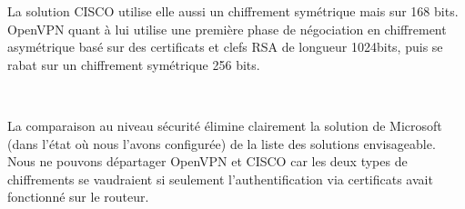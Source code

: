 La solution CISCO utilise elle aussi un chiffrement symétrique mais sur 168 bits. OpenVPN quant à lui utilise une première phase de négociation en chiffrement asymétrique basé sur des certificats et clefs RSA de longueur 1024bits, puis se rabat sur un chiffrement symétrique 256 bits.

~

La comparaison au niveau sécurité élimine clairement la solution de Microsoft (dans l'état où nous l'avons configurée) de la liste des solutions envisageable. Nous ne pouvons départager OpenVPN et CISCO car les deux types de chiffrements se vaudraient si seulement l'authentification via certificats avait fonctionné sur le routeur.
